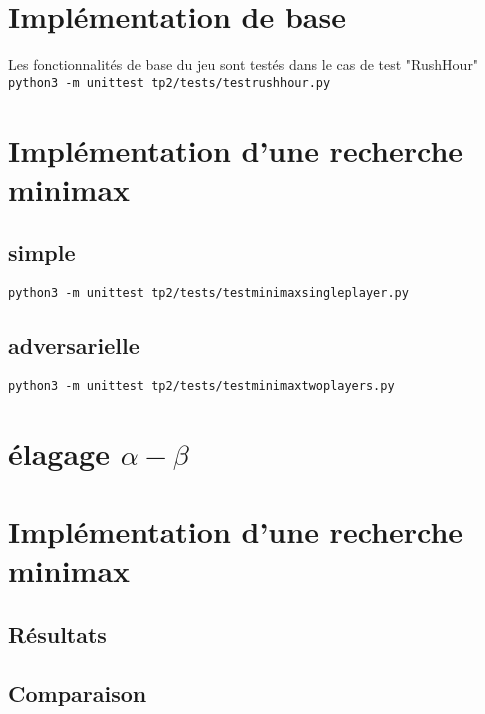 \documentclass{article}
\begin{document}
    

    \section{Implémentation de base}

    Les fonctionnalités de base du jeu sont testés dans le cas de test "RushHour"
    \texttt{python3 -m unittest tp2/tests/testrushhour.py}

    \section{Implémentation d'une recherche minimax}

    \subsection{simple}

    \texttt{python3 -m unittest tp2/tests/testminimaxsingleplayer.py}

    \subsection{adversarielle}

    \texttt{python3 -m unittest tp2/tests/testminimaxtwoplayers.py}

    \section{élagage $\alpha-\beta$}
    \section{Implémentation d'une recherche minimax}

    \subsection{Résultats}
    \subsection{Comparaison}
\end{document}
